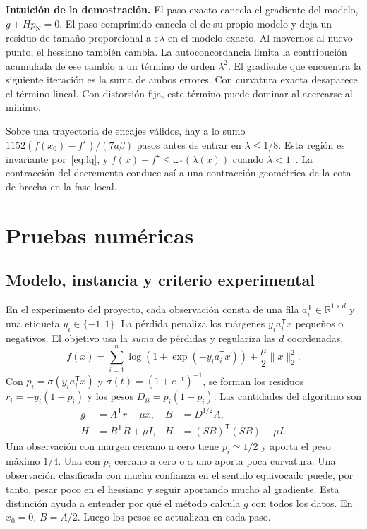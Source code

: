 \documentclass[11pt,a4paper]{article}
\newcommand{\R}{\mathbb R}
\newcommand{\T}{^{\mathsf T}}
\newcommand{\eps}{\varepsilon}
\newcommand{\nrm}[1]{\lVert #1\rVert}
\newcommand{\pN}{p_{\mathrm N}}
\newcommand{\HS}{\widetilde H}
\newcommand{\tema}[1]{\smallskip\par\textbf{#1}\enspace\ignorespaces}
\begin{document}
\tema{Intuición de la demostración.}
El paso exacto cancela el gradiente del modelo, $g+H\pN=0$. El paso comprimido cancela el de su propio modelo y deja un residuo de tamaño proporcional a $\eps\lambda$ en el modelo exacto. Al movernos al nuevo punto, el hessiano también cambia. La autoconcordancia limita la contribución acumulada de ese cambio a un término de orden $\lambda^2$. El gradiente que encuentra la siguiente iteración es la suma de ambos errores. Con curvatura exacta desaparece el término lineal. Con distorsión fija, este término puede dominar al acercarse al mínimo.

Sobre una trayectoria de encajes válidos, hay a lo sumo $1152(f(x_0)-f^\star)/(7a\beta)$ pasos antes de entrar en $\lambda\le1/8$. Esta región es invariante por~\eqref{eq:lq}, y $f(x)-f^\star\le\omega_*(\lambda(x))$ cuando $\lambda<1$~\cite{BV}. La contracción del decremento conduce así a una contracción geométrica de la cota de brecha en la fase local.


\section{Pruebas numéricas}\label{sec:exp}
\subsection{Modelo, instancia y criterio experimental}
En el experimento del proyecto, cada observación consta de una fila $a_i\T\in\R^{1\times d}$ y una etiqueta $y_i\in\{-1,1\}$. La pérdida penaliza los márgenes $y_i a_i\T x$ pequeños o negativos. El objetivo usa la \emph{suma} de pérdidas y regulariza las $d$ coordenadas,
\begin{equation}
 f(x)=\sum_{i=1}^n\log\!\left(1+\exp(-y_i a_i\T x)\right)
          +\frac{\mu}{2}\nrm{x}_2^2 . \label{eq:logistica}
\end{equation}
Con $p_i=\sigma(y_i a_i\T x)$ y $\sigma(t)=(1+e^{-t})^{-1}$, se forman los residuos $r_i=-y_i(1-p_i)$ y los pesos $D_{ii}=p_i(1-p_i)$. Las cantidades del algoritmo son
\begin{align*}
 g &=A\T r+\mu x, & B&=D^{1/2}A,\\
 H &=B\T B+\mu I, & \HS&=(SB)\T(SB)+\mu I .
\end{align*}
Una observación con margen cercano a cero tiene $p_i\simeq1/2$ y aporta el peso máximo $1/4$. Una con $p_i$ cercano a cero o a uno aporta poca curvatura. Una observación clasificada con mucha confianza en el sentido equivocado puede, por tanto, pesar poco en el hessiano y seguir aportando mucho al gradiente. Esta distinción ayuda a entender por qué el método calcula $g$ con todos los datos. En $x_0=0$, $B=A/2$. Luego los pesos se actualizan en cada paso.
\end{document}
